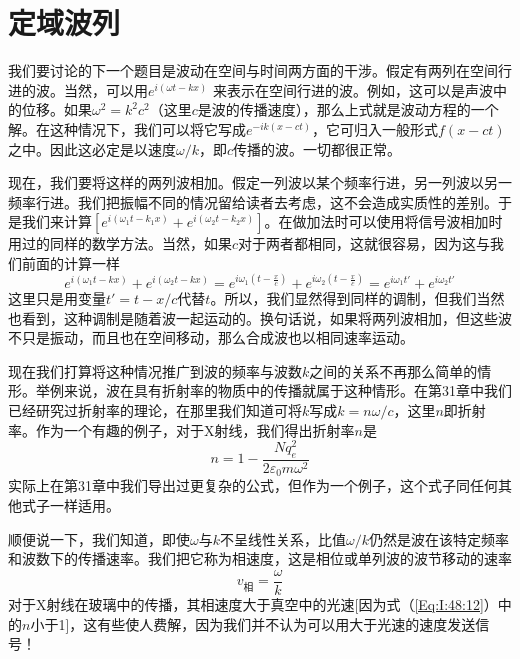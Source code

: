 \section{定域波列}

我们要讨论的下一个题目是波动在空间与时间两方面的干涉。假定有两列在空间行进的波。当然，可以用$e^{i(\omega t - kx)}$ 来表示在空间行进的波。例如，这可以是声波中的位移。如果$\omega^2 =k^2 c^2$（这里$c$是波的传播速度），那么上式就是波动方程的一个解。在这种情况下，我们可以将它写成$e^{-ik(x - ct)}$，它可归入一般形式$f(x-ct)$之中。因此这必定是以速度$\omega/k$，即$c$传播的波。一切都很正常。

现在，我们要将这样的两列波相加。假定一列波以某个频率行进，另一列波以另一频率行进。我们把振幅不同的情况留给读者去考虑，这不会造成实质性的差别。于是我们来计算$\left[e^{i(\omega_1t-k_1x)} + e^{i(\omega_2 t -k_2x)}\right]$。在做加法时可以使用将信号波相加时用过的同样的数学方法。当然，如果$c$对于两者都相同，这就很容易，因为这与我们前面的计算一样
\begin{equation}
    \label{Eq:I:48:11}
    e^{i(\omega_1t-kx)} + e^{i(\omega_2 t -kx)} = e^{i\omega_1(t-\frac{x}{c})} + e^{i\omega_2(t-\frac{x}{c})} = e^{i\omega_1t'} + e^{i\omega_2t'}
\end{equation}
这里只是用变量$t'=t -x/c$代替$t$。所以，我们显然得到同样的调制，但我们当然也看到，这种调制是随着波一起运动的。换句话说，如果将两列波相加，但这些波不只是振动，而且也在空间移动，那么合成波也以相同速率运动。

现在我们打算将这种情况推广到波的频率与波数$k$之间的关系不再那么简单的情形。举例来说，波在具有折射率的物质中的传播就属于这种情形。在第31章中我们已经研究过折射率的理论，在那里我们知道可将$k$写成$k=n\omega/c$，这里$n$即折射率。作为一个有趣的例子，对于X射线，我们得出折射率$n$是
\begin{equation}
    \label{Eq:I:48:12}
    n = 1 - \frac{Nq_e^2}{2\varepsilon_0m\omega^2}
\end{equation}
实际上在第31章中我们导出过更复杂的公式，但作为一个例子，这个式子同任何其他式子一样适用。

顺便说一下，我们知道，即使$\omega$与$k$不呈线性关系，比值$\omega /k$仍然是波在该特定频率和波数下的传播速率。我们把它称为相速度，这是相位或单列波的波节移动的速率
\begin{equation}
    \label{Eq:I:48:13}
    v_\text{相} = \frac{\omega}{k}
\end{equation}
对于X射线在玻璃中的传播，其相速度大于真空中的光速[因为式（\ref{Eq:I:48:12}）中的$n$小于1]，这有些使人费解，因为我们并不认为可以用大于光速的速度发送信号！

